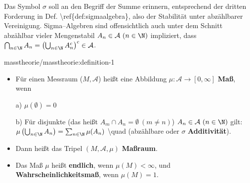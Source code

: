 \par
Das Symbol \(\sigma\) soll an den Begriff der Summe erinnern, entsprechend der
dritten Forderung in Def. \textbackslash{}ref\{def:sigmaalgebra\}, also der Stabilität unter abzählbarer Vereinigung.
Sigma–Algebren sind offensichtlich auch unter dem Schnitt abzählbar vieler
Mengenstabil \(A_n\in \mathcal{A}\ (n\in\N)\) impliziert, dass \(\bigcap_{n\in \N} A_n = \left(\bigcup_{n\in\N} A_n^c\right)^c\in \mathcal{A}\).
\begin{definition}{}{masstheorie/masstheorie:definition-1}


\begin{itemize}
\item {} 
\par
Für einen Messraum (\(M, \mathcal{A}\)) heißt eine Abbildung \(\mu: \mathcal{A}\to [0, \infty]\) \textbf{Maß}, wenn

\par
a) \(\mu(\emptyset) = 0\)

\par
b) Für disjunkte (das heißt \(A_m\cap A_n = \emptyset\ (m\neq n)\)) \(A_n\in \mathcal{A}\ (n\in\N)\) gilt: \(\mu\left( \bigcup_{n\in\N}A_n \right) = \sum_{n\in\N}\mu (A_n)\) \textbackslash{}quad (abzählbare oder \(\sigma\) \textbf{Additivität}).

\item {} 
\par
Dann heißt das Tripel \((M, \mathcal{A}, \mu)\) \textbf{Maßraum}.

\item {} 
\par
Das Maß \(\mu\) heißt \textbf{endlich}, wenn \(\mu(M)<\infty\), und \textbf{Wahrscheinlichkeitsmaß}, wenn \(\mu(M)=1\).

\end{itemize}
\end{definition}
